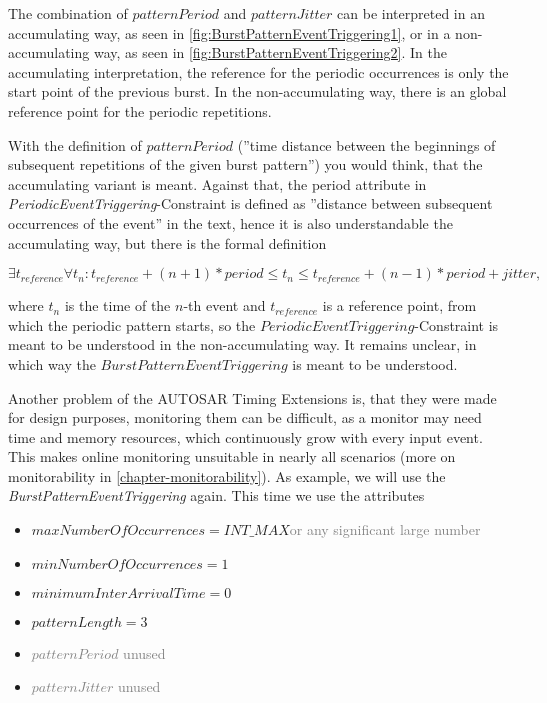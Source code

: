The combination of $patternPeriod$ and $patternJitter$ can be interpreted in an accumulating way, as seen in \ref{fig:BurstPatternEventTriggering1}, or in a non-accumulating way, as seen in \ref{fig:BurstPatternEventTriggering2}. In the accumulating interpretation, the reference for the periodic occurrences is only the start point of the previous burst. In the non-accumulating way, there is an global reference point for the periodic repetitions.

With the definition of $patternPeriod$ (''time distance between the beginnings of subsequent repetitions of the given burst pattern''\cite{TIMEX}) you would think, that the accumulating variant is meant. Against that, the period attribute in \textit{PeriodicEventTriggering}-Constraint is defined as ''distance between subsequent occurrences of the event''\cite{TIMEX} in the text, hence it is also understandable the accumulating way, but there is the formal definition

\begin{math}
\exists t_{reference}\forall t_n: t_{reference}+(n+1)*period\leq t_n\leq t_{reference}+(n-1)*period+jitter,
\end{math}

where $t_n$ is the time of the $n$-th event and $t_{reference}$ is a reference point, from which the periodic pattern starts, so the $PeriodicEventTriggering$-Constraint is meant to be understood in the non-accumulating way. It remains unclear, in which way the $BurstPatternEventTriggering$ is meant to be understood.

Another problem of the AUTOSAR Timing Extensions is, that they were made for design purposes, monitoring them can be difficult, as a monitor may need time and memory resources, which continuously grow with every input event. This makes online monitoring unsuitable in nearly all scenarios (more on monitorability in \ref{chapter-monitorability}). As example, we will use the \textit{BurstPatternEventTriggering} again. This time we use the attributes
\begin{itemize}
	\item
	$maxNumberOfOccurrences = INT\_MAX$\textcolor{gray}{or any significant large number}
	\item
	$minNumberOfOccurrences = 1$
	\item
	$minimumInterArrivalTime = 0$
	\item
	$patternLength = 3$
	\item
	\textcolor{gray}{$patternPeriod$} \textcolor{gray}{unused}
	\item
	\textcolor{gray}{$patternJitter$} \textcolor{gray}{unused}
\end{itemize}

